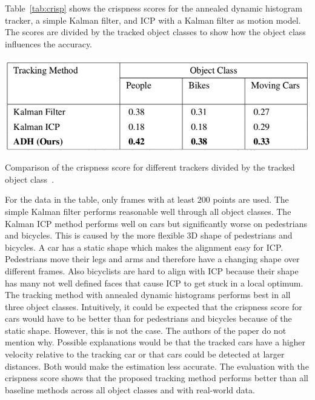 \documentclass[twoside,a4paper,article]{combine}
\begin{document}
Table~\ref{tab:crisp} shows the crispness scores for the annealed
dynamic histogram tracker, a simple Kalman filter, and ICP with a
Kalman filter as motion model. The scores are divided by the tracked
object classes to show how the object class influences the accuracy.
\begin{table}
  \center
  \includegraphics[width=.8\linewidth]{crispness-scores}
  \caption{Comparison of the crispness score for different trackers
    divided by the tracked object class~\cite{paper}.}
  \label{tab:crisp}
\end{table}
For the data in the table, only frames with at least $200$ points are
used. The simple Kalman filter performs reasonable well through all
object classes. The Kalman ICP method performs well on cars but
significantly worse on pedestrians and bicycles. This is caused by the
more flexible 3D shape of pedestrians and bicycles. A car has a static
shape which makes the alignment easy for ICP. Pedestrians move their
legs and arms and therefore have a changing shape over different
frames. Also bicyclists are hard to align with ICP because their shape
has many not well defined faces that cause ICP to get stuck in a local
optimum. The tracking method with annealed dynamic histograms performs
best in all three object classes. Intuitively, it could be expected
that the crispness score for cars would have to be better than for
pedestrians and bicycles because of the static shape. However, this is
not the case. The authors of the paper do not mention why. Possible
explanations would be that the tracked cars have a higher velocity
relative to the tracking car or that cars could be detected at larger
distances. Both would make the estimation less accurate.
The evaluation with the crispness score shows that the proposed
tracking method performs better than all baseline methods across all
object classes and with real-world data.

\end{document}
